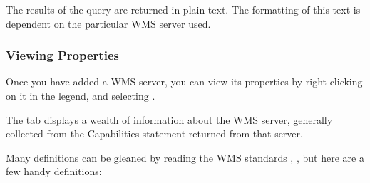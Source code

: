 The results of the query are returned in plain text.
The formatting of this text is dependent on the particular
WMS server used.


\subsubsection{Viewing Properties}\label{sec:ogc-wms-properties}

Once you have added a WMS server, you can view its properties
by right-clicking on it in the legend, and selecting
.


\label{sec:ogc-wms-properties-metadata}

The  tab displays a wealth of information about the WMS server,
generally collected from the Capabilities statement returned from
that server.

Many definitions can be gleaned by reading the WMS
standards \cite{OGCWMS010101web}, \cite{OGCWMS010300web}, but
here are a few handy definitions:

